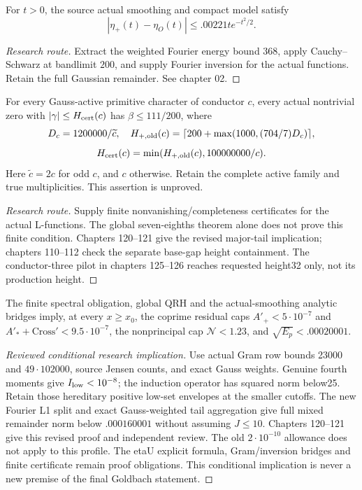 \begin{theorem}\label{smoothing}\notready
For $t>0$, the source actual smoothing and compact model satisfy
\[|\eta_+(t)-\eta_O(t)|\le .00221t e^{-t^2/2}.\]
\end{theorem}
\begin{proof}[Research route]
Extract the weighted Fourier energy bound $368$, apply Cauchy--Schwarz at
bandlimit $200$, and supply Fourier inversion for the actual functions.
Retain the full Gaussian remainder. See chapter 02.
\end{proof}

\begin{theorem}\label{finitespectral}\notready
For every Gauss-active primitive character of conductor $c$, every actual
nontrivial zero with $|\gamma|\le H_{\rm cert}(c)$ has $\beta\le111/200$, where
\[D_c=1200000/\widetilde c,\quad
 H_{+,\rm old}(c)=\lceil200+\max(1000,(704/7)D_c)\rceil,\]
\[H_{\rm cert}(c)=\min(H_{+,\rm old}(c),100000000/c).\]
Here $\widetilde c=2c$ for odd $c$, and $c$ otherwise. Retain the complete
active family and true multiplicities. This assertion is unproved.
\end{theorem}
\begin{proof}[Research route]
Supply finite nonvanishing/completeness certificates for the actual
L-functions. The global seven-eighths theorem alone does not prove this
finite condition. Chapters 120--121 give the revised major-tail implication;
chapters 110--112 check the separate base-gap height containment.
The conductor-three pilot in chapters 125--126 reaches requested height32
only, not its production height.
\end{proof}

\begin{theorem}\label{familymoments}\notready
The finite spectral obligation, global QRH and the actual-smoothing
analytic bridges imply, at every $x\ge x_0$, the coprime residual caps
$A'_+<5\cdot10^{-7}$ and $A'_*+\mathrm{Cross}'<9.5\cdot10^{-7}$,
the nonprincipal cap $\mathcal N<1.23$, and
$\sqrt{E_p}<.00020001$.
\end{theorem}
\begin{proof}[Reviewed conditional research implication]
Use actual Gram row bounds 23000 and $49\cdot102000$, source Jensen
counts, and exact Gauss weights. Genuine fourth moments give
$I_{\rm low}<10^{-8}$; the induction operator has squared norm below25.
Retain those hereditary positive low-set envelopes at the smaller cutoffs.
The new Fourier L1 split and exact Gauss-weighted tail aggregation give
full mixed remainder norm below $.000160001$ without assuming $J\le10$.
Chapters 120--121 give this revised proof and independent review.
The old $2\cdot10^{-10}$ allowance does not apply to this profile.
The etaU explicit formula, Gram/inversion bridges and finite certificate
remain proof obligations. This conditional implication is never a new
premise of the final Goldbach statement.
\end{proof}

